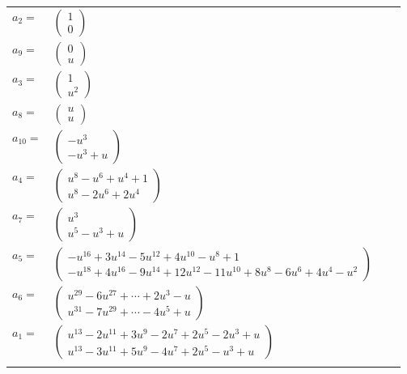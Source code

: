 \documentclass[1p]{elsarticle_modified}
\theoremstyle{definition}
\begin{document}
\begin{tabular}{m{7pt} m{180pt} m{7pt} m{180pt} }
\flushright $a_{2}=$&$\begin{pmatrix}1\\0\end{pmatrix}$ \\
\flushright $a_{9}=$&$\begin{pmatrix}0\\u\end{pmatrix}$ \\
\flushright $a_{3}=$&$\begin{pmatrix}1\\u^2\end{pmatrix}$ \\
\flushright $a_{8}=$&$\begin{pmatrix}u\\u\end{pmatrix}$ \\
\flushright $a_{10}=$&$\begin{pmatrix}- u^3\\- u^3+u\end{pmatrix}$ \\
\flushright $a_{4}=$&$\begin{pmatrix}u^8- u^6+u^4+1\\u^8-2 u^6+2 u^4\end{pmatrix}$ \\
\flushright $a_{7}=$&$\begin{pmatrix}u^3\\u^5- u^3+u\end{pmatrix}$ \\
\flushright $a_{5}=$&$\begin{pmatrix}- u^{16}+3 u^{14}-5 u^{12}+4 u^{10}- u^8+1\\- u^{18}+4 u^{16}-9 u^{14}+12 u^{12}-11 u^{10}+8 u^8-6 u^6+4 u^4- u^2\end{pmatrix}$ \\
\flushright $a_{6}=$&$\begin{pmatrix}u^{29}-6 u^{27}+\cdots+2 u^3- u\\u^{31}-7 u^{29}+\cdots-4 u^5+u\end{pmatrix}$ \\
\flushright $a_{1}=$&$\begin{pmatrix}u^{13}-2 u^{11}+3 u^9-2 u^7+2 u^5-2 u^3+u\\u^{13}-3 u^{11}+5 u^9-4 u^7+2 u^5- u^3+u\end{pmatrix}$\\&\end{tabular}
\end{document}
